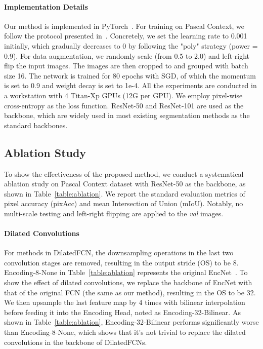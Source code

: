 \documentclass[10pt,twocolumn,letterpaper]{article}
\begin{document}
\paragraph{Implementation Details}
Our method is implemented in PyTorch~\cite{paszke2017automatic}.
For training on Pascal Context, we follow the protocol presented in~\cite{zhang2018context}.
Concretely, we set the learning rate to 0.001 initially, which gradually decreases to 0 by following the "poly" strategy (power = 0.9).
For data augmentation, we randomly scale (from 0.5 to 2.0) and left-right flip the input images.
The images are then cropped to  and grouped with batch size 16.
The network is trained for 80 epochs with SGD, of which the momentum is set to 0.9 and weight decay is set to 1e-4.
All the experiments are conducted in a workstation with 4 Titan-Xp GPUs (12G per GPU).
We employ pixel-wise cross-entropy as the loss function.
ResNet-50 and ResNet-101 are used as the backbone, which are widely used in most existing segmentation methods as the standard backbones.
\subsection{Ablation Study}
To show the effectiveness of the proposed method, we conduct a systematical ablation study on Pascal Context dataset with ResNet-50 as the backbone, as shown in Table~\ref{table:ablation}.
We report the standard evaluation metrics of pixel accuracy (pixAcc) and mean Intersection of Union (mIoU).
Notably, no multi-scale testing and left-right flipping are applied to the \textit{val} images.
\vspace{-1em}
\paragraph{Dilated Convolutions}
For methods in DilatedFCN, the downsampling operations in the last two convolution stages are removed, resulting in the output stride (OS) to be 8.
Encoding-8-None in Table~\ref{table:ablation} represents the original EncNet~\cite{zhang2018context}.
To show the effect of dilated convolutions, we replace the backbone of EncNet with that of the original FCN (the same as our method), resulting in the OS to be 32.
We then upsample the last feature map by 4 times with bilinear interpolation before feeding it into the Encoding Head, noted as Encoding-32-Bilinear.
As shown in Table~\ref{table:ablation}, Encoding-32-Bilinear performs significantly worse than Encoding-8-None, which shows that it's not trivial to replace the dilated convolutions in the backbone of DilatedFCNs.
\vspace{-1em}
\end{document}
